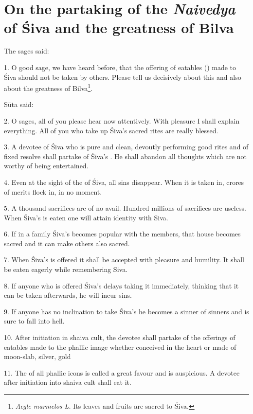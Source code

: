 \chapter{On the partaking of the \emph{Naivedya} of Śiva and the greatness of Bilva}

The sages said:

1. O good sage, we have heard before, that the offering of eatables
() made to Śiva should not be taken by others. Please tell us
decisively about this and also about the greatness of Bilva\footnote{\emph{Aegle
marmelos L.} Its leaves and fruits are sacred to Śiva.}.

Sūta said:

2. O sages, all of you please hear now attentively. With pleasure I shall
explain everything. All of you who take up Śiva’s sacred rites are really blessed.

3. A devotee of Śiva who is pure and clean, devoutly performing good rites and
of fixed resolve shall partake of Śiva’s . He shall abandon all
thoughts which are not worthy of being entertained.

4. Even at the sight of the  of Śiva, all sins disappear. When it
is taken in, crores of merits flock in, in no moment.

5. A thousand sacrifices are of no avail. Hundred millions of sacrifices are
useless. When Śiva’s  is eaten one will attain identity with Siva.

6. If in a family Śiva’s  becomes popular with the members, that
house becomes sacred and it can make others also sacred.

7. When Śiva’s  is offered it shall be accepted with pleasure and
humility. It shall be eaten eagerly while remembering Siva.

8. If anyone who is offered Śiva’s  delays taking it immediately,
thinking that it can be taken afterwards, he will incur sins.

9. If anyone has no inclination to take Śiva’s  he becomes a sinner
of sinners and is sure to fall into hell.

10. After initiation in shaiva cult, the devotee shall partake of the offerings
of eatables made to the phallic image whether conceived in the heart or made of
moon-slab, silver, gold \etc

11. The  of all phallic icons is called a great favour and is
auspicious. A devotee after initiation into shaiva cult shall eat it.

